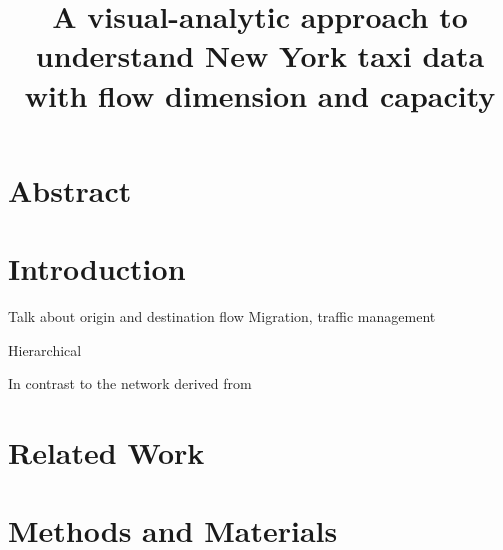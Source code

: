 \documentclass[a4paper,11pt]{article}
\begin{document}
\title{A visual-analytic approach to understand New York taxi data with flow dimension and capacity}
\maketitle

\section*{\centering Abstract}



\section{Introduction}
Talk about origin and destination flow
Migration, traffic management


Hierarchical

In contrast to the network derived from 


\section{Related Work}

\section{Methods and Materials}
\end{document}
